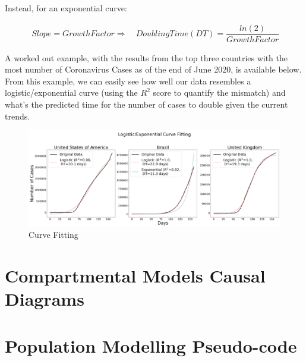 \begin{appendices}
Instead, for an exponential curve:

\useshortskip
\begin{align}
\ Slope = Growth Factor \Rightarrow\quad Doubling Time (DT) = \dfrac{ln(2)}{Growth Factor}
\end{align}
\useshortskip

A worked out example, with the results from the top three countries with the most number of Coronavirus Cases as of the end of June 2020, is available below. From this example, we can easily see how well our data resembles a logistic/exponential curve (using the $R^{2}$ score to quantify the mismatch) and what's the predicted time for the number of cases to double given the current trends.

\begin{figure}[ht!]%
    \centering
    \includegraphics[width=1\linewidth]{latex/images/fitting.pdf}
    \caption{Curve Fitting}
\end{figure}

\clearpage

\section{Compartmental Models Causal Diagrams}
\label{causal_comp}


\clearpage

\section{Population Modelling Pseudo-code}
\label{code_alg}


\end{appendices}
